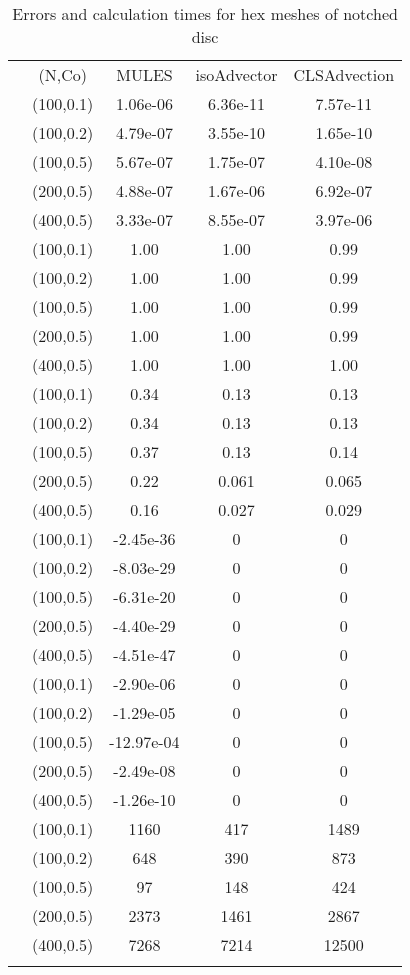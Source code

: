 \begin{table}
\centering
\caption{Errors and calculation times for hex meshes of notched disc}
\label{Tab:01}
\begin{tabular}{ccccc}
\hline\noalign{\smallskip}
\quad &(N,Co) & MULES &isoAdvector &CLSAdvection  \\
\noalign{\smallskip}\hline\noalign{\smallskip}
\multirow{5}{*}{$\varepsilon_{V}$}
&(100,0.1)& 1.06e-06 &6.36e-11 &7.57e-11  \\
&(100,0.2) & 4.79e-07 &3.55e-10 &1.65e-10\\
&(100,0.5)& 5.67e-07 &1.75e-07 &4.10e-08\\
&(200,0.5) & 4.88e-07 &1.67e-06 &6.92e-07\\
&(400,0.5) & 3.33e-07 &8.55e-07 &3.97e-06\\
\hline\noalign{\smallskip}
\multirow{5}{*}{$\varepsilon_{M}$}
&(100,0.1)& 1.00 &1.00 &0.99  \\
&(100,0.2) & 1.00 &1.00 &0.99\\
&(100,0.5)& 1.00 &1.00 &0.99\\
&(200,0.5) & 1.00 &1.00 &0.99\\
&(400,0.5) & 1.00 &1.00 &1.00\\
\hline\noalign{\smallskip}
\multirow{5}{*}{$\varepsilon_{S}$}
&(100,0.1)& 0.34 &0.13 &0.13  \\
&(100,0.2) & 0.34 &0.13 &0.13\\
&(100,0.5)& 0.37 &0.13 &0.14\\
&(200,0.5) & 0.22 &0.061 &0.065\\
&(400,0.5) & 0.16 &0.027 &0.029\\
\hline\noalign{\smallskip}
\multirow{5}{*}{$\min(\alpha)$}
&(100,0.1)& -2.45e-36 &0 &0  \\
&(100,0.2) & -8.03e-29 &0 &0\\
&(100,0.5)& -6.31e-20 &0 &0\\
&(200,0.5) & -4.40e-29 &0 &0\\
&(400,0.5) & -4.51e-47 &0 &0\\
\hline\noalign{\smallskip}
\multirow{5}{*}{$\max(\alpha)-1$}
&(100,0.1)& -2.90e-06 &0 &0  \\
&(100,0.2) & -1.29e-05 &0 &0 \\
&(100,0.5)& -12.97e-04 &0 &0\\
&(200,0.5) & -2.49e-08 &0 &0\\
&(400,0.5) & -1.26e-10 &0 &0\\
\hline\noalign{\smallskip}
\multirow{5}{*}{$T_{calc}$}
&(100,0.1)& 1160 &417 &1489  \\
&(100,0.2) & 648 &390 &873\\
&(100,0.5)& 97 &148 &424\\
&(200,0.5) & 2373 &1461 &2867\\
&(400,0.5) & 7268 &7214 &12500\\
\noalign{\smallskip}\hline
\end{tabular}
\end{table}

